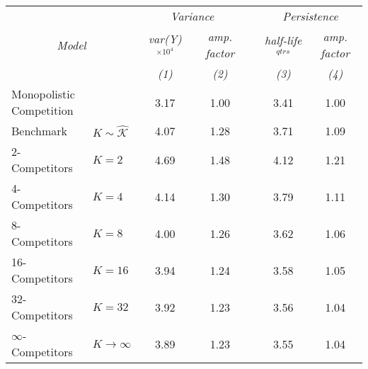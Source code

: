 \begin{tabular}{llccccc}
	 && \multicolumn{2}{c}{\emph{Variance}} && \multicolumn{2}{c}{\emph{Persistence}}\\ 
 	 \cline{3-4} \cline{6-7} 
	 \multicolumn{2}{c}{\emph{Model}} & \emph{var(Y) $^{\times 10^{4}}$} & \emph{amp. factor} && \emph{half-life} $^{qtrs}$ & \emph{amp. factor} \\ 
	 && \emph{(1)} & \emph{(2)} && \emph{(3)} & \emph{(4)} \\ 
	 \hline 
	 \multicolumn{2}{l|}{Monopolistic Competition} & 3.17 & 1.00 && 3.41 & 1.00 \\ 
	 Benchmark & \multicolumn{1}{l|}{$K\sim \hat{\mathcal{K}}$} & 4.07 & 1.28 && 3.71 & 1.09 \\ 
	 \hline 
	 2-Competitors & \multicolumn{1}{l|}{$K=2$} & 4.69 & 1.48 && 4.12 & 1.21 \\ 
	 4-Competitors & \multicolumn{1}{l|}{$K=4$} & 4.14 & 1.30 && 3.79 & 1.11 \\ 
	 8-Competitors & \multicolumn{1}{l|}{$K=8$} & 4.00 & 1.26 && 3.62 & 1.06 \\ 
	 16-Competitors & \multicolumn{1}{l|}{$K=16$} & 3.94 & 1.24 && 3.58 & 1.05 \\ 
	 32-Competitors & \multicolumn{1}{l|}{$K=32$} & 3.92 & 1.23 && 3.56 & 1.04 \\ 
	 $\infty$-Competitors & \multicolumn{1}{l|}{$K\to\infty$} & 3.89 & 1.23 && 3.55 & 1.04 \\ 
	 \hline 
\end{tabular}